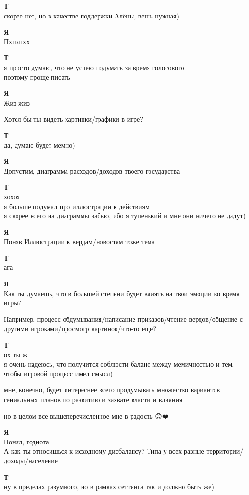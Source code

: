 \begin{tabbing}
\textbf{Т} \\
скорее нет, но в качестве поддержки Алёны, вещь нужная)

\textbf{Я} \\
Пхпхпхх

\textbf{Т} \\
я просто думаю, что не успею подумать за время голосового \\
поэтому проще писать

\textbf{Я} \\
Жиз жиз

Хотел бы ты видеть картинки/графики в игре?

\textbf{Т} \\
да, думаю будет мемно)

\textbf{Я} \\
Допустим, диаграмма расходов/доходов твоего государства

\textbf{Т} \\
хохох \\
я больше подумал про иллюстрации к действиям \\
я скорее всего на диаграммы забью, ибо я тупенький и мне они ничего не дадут)

\textbf{Я} \\
Поняв
Иллюстрации к вердам/новостям тоже тема

\textbf{Т} \\
ага

\textbf{Я} \\
Как ты думаешь, что в большей степени будет влиять на твои эмоции во время игры?

Например, процесс обдумывания/написание приказов/чтение вердов/общение с другими игроками/просмотр картинок/что-то еще?

\textbf{Т} \\
ох ты ж \\
я очень надеюсь, что получится соблюсти баланс между мемичностью и тем, чтобы игровой процесс имел смысл)

мне, конечно, будет интереснее всего продумывать множество вариантов гениальных планов по развитию и захвате власти и влияния

но в целом все вышеперечисленное мне в радость 😊❤️

\textbf{Я} \\
Понял, годнота \\
А как ты относишься к исходному дисбалансу? Типа у всех разные территории/доходы/население

\textbf{Т} \\
ну в пределах разумного, но в рамках сеттинга так и должно быть же)

\end{tabbing}
